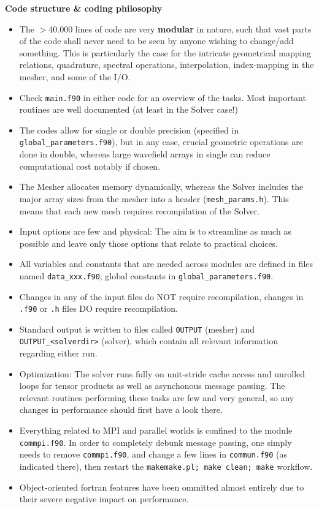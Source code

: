 \documentclass[11pt,letter,fleqn,english,notitlepage]{article}
\begin{document}
\textbf{Code structure \& coding philosophy}
\begin{itemize}
\item The $>$40.000 lines of code 
are very \textbf{modular} in nature, such that vast parts of the code shall never need to be seen by anyone 
wishing to change/add something. This is particularly the case for the intricate geometrical mapping relations, quadrature, 
spectral operations, interpolation, index-mapping in the mesher, and some of the I/O.
\item Check {\tt main.f90} in either code for an overview of the tasks. Most important routines are well documented 
(at least in the Solver case!)
\item The codes allow for single or double precision (specified in {\tt global\_parameters.f90}), but in any case, crucial 
geometric operations are done in double, whereas large wavefield arrays in single can reduce computational cost 
notably if chosen.
\item The Mesher allocates memory dynamically, whereas the Solver includes the major array sizes from the mesher into 
a header ({\tt mesh\_params.h}). This means that each new mesh requires recompilation of the Solver. 
\item Input options are few and physical: The aim is to streamline as much as possible and leave only those options that 
relate to practical choices.
\item All variables and constants that are needed across modules are defined 
in files named {\tt data\_xxx.f90}; global constants in {\tt global\_parameters.f90}.
\item Changes in any of the input files do NOT require recompilation, changes in 
{\tt *.f90} or {\tt *.h} files DO require recompilation. 
\item Standard output is written to files called 
{\tt OUTPUT} (mesher) and {\tt OUTPUT\_<solverdir>} (solver), 
which contain all relevant information regarding either run. 
\item Optimization: The solver runs fully on unit-stride cache access and unrolled loops for tensor products 
as well as asynchonous message passing. The relevant routines performing these tasks are few and very 
general, so any changes in performance should first have a look there.
\item Everything related to MPI and parallel worlds is confined to the module {\tt commpi.f90}. In order to completely 
debunk message passing, one simply needs to remove {\tt commpi.f90}, and change a few lines in {\tt commun.f90} (as 
indicated there), then restart the {\tt makemake.pl; make clean; make} workflow. 
\item Object-oriented fortran features have been ommitted almost entirely due to their severe negative impact on performance.
\end{itemize}
\end{document}
